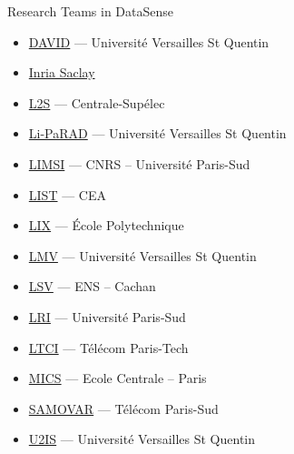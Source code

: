 \begin{frame}{Research Teams in DataSense}

\begin{itemize}
\item \href{http://.david.uvsq.fr/}{DAVID} --- Université Versailles St Quentin
\item \href{http://www.inria.fr/centre/saclay }{Inria Saclay}
\item \href{http://www.l2s.centralesupelec.fr/}{L2S} --- Centrale-Supélec
\item \href{http://www.uvsq.fr/laboratoire-d-informatique-parallelisme-reseaux-algorithmes-distribues-li-parad}{Li-PaRAD} --- Université Versailles St Quentin
\item \href{https://www.limsi.fr/fr/}{LIMSI} --- CNRS – Université Paris-Sud
\item \href{http://www-list.cea.fr/}{LIST} --- CEA
\item \href{http://www.lix.polytechnique.fr/}{LIX} --- École Polytechnique
\item \href{http://lmv.math.cnrs.fr/}{LMV} --- Université Versailles St Quentin
\item \href{http://www.lsv.ens-cachan.fr/}{LSV} --- ENS – Cachan
\item \href{http://www.lri.fr/}{LRI} --- Université Paris-Sud
\item \href{https://www.ltci.telecom-paristech.fr/}{LTCI} --- Télécom Paris-Tech
\item \href{http://www.mics.ecp.fr/}{MICS} --- Ecole Centrale – Paris
\item \href{http://www.samovar.telecom-sudparis.eu/}{SAMOVAR} --- Télécom Paris-Sud
\item \href{http://u2is.ensta-paristech.fr/}{U2IS} --- Université Versailles St Quentin
\end{itemize}
\end{frame}


